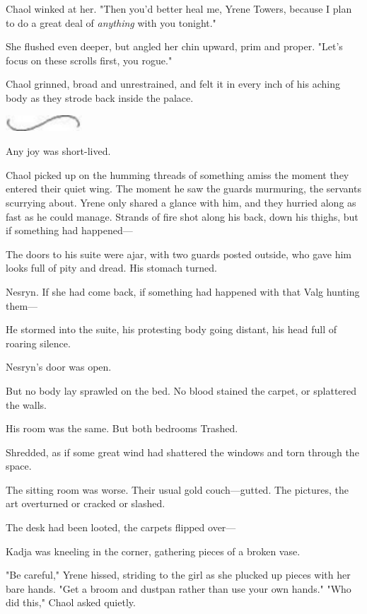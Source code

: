Chaol winked at her. "Then you'd better heal me, Yrene Towers, because I plan to do a great deal of \emph{anything} with you tonight."

She flushed even deeper, but angled her chin upward, prim and proper. "Let's focus on these scrolls first, you rogue."

Chaol grinned, broad and unrestrained, and felt it in every inch of his aching body as they strode back inside the palace.

\includegraphics[width=1.12in,height=0.24in]{images/seperator}

Any joy was short-lived.

Chaol picked up on the humming threads of something amiss the moment they entered their quiet wing. The moment he saw the guards murmuring, the servants scurrying about. Yrene only shared a glance with him, and they hurried along as fast as he could manage. Strands of fire shot along his back, down his thighs, but if something had happened---

The doors to his suite were ajar, with two guards posted outside, who gave him looks full of pity and dread. His stomach turned.

Nesryn. If she had come back, if something had happened with that Valg hunting them---

He stormed into the suite, his protesting body going distant, his head full of roaring silence.

Nesryn's door was open.

But no body lay sprawled on the bed. No blood stained the carpet, or splattered the walls.

His room was the same. But both bedrooms  Trashed.

Shredded, as if some great wind had shattered the windows and torn through the space.

The sitting room was worse. Their usual gold couch---gutted. The pictures, the art overturned or cracked or slashed.

The desk had been looted, the carpets flipped over---

Kadja was kneeling in the corner, gathering pieces of a broken vase.

"Be careful," Yrene hissed, striding to the girl as she plucked up pieces with her bare hands. "Get a broom and dustpan rather than use your own hands." "Who did this," Chaol asked quietly.

